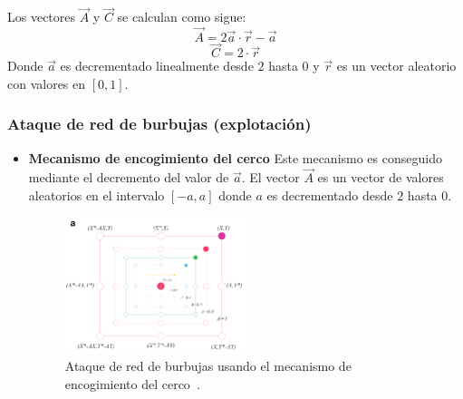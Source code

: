 Los vectores $\vec{A}$ y $\vec{C}$ se calculan como sigue:
\begin{equation}
    \vec{A}=2\vec{a}\cdot\vec{r}-\vec{a}
\end{equation}
\begin{equation}
    \vec{C}=2\cdot\vec{r}
\end{equation}
Donde $\vec{a}$ es decrementado linealmente desde $2$ hasta $0$ y $\vec{r}$ es un vector aleatorio con valores en $[0,1]$.

\subsubsection{Ataque de red de burbujas (explotación)}
\begin{itemize}
    \item \textbf{Mecanismo de encogimiento del cerco}
          Este mecanismo es conseguido mediante el decremento del valor de $\vec{a}$. El vector $\vec{A}$ es un vector de valores aleatorios en el intervalo $[-a,a]$ donde $a$ es decrementado desde $2$ hasta $0$.
          \begin{figure}[H]
              \centering
              \includegraphics[width=0.5\textwidth]{imagenes/wao-shrinking-circle-prey-mechanism.png}
              \caption[Mecanismo de encogimiento del cerco]{Ataque de red de burbujas usando el mecanismo de encogimiento del cerco~\cite{mirjalili_whale_2016}.}
          \end{figure}


\end{itemize}
